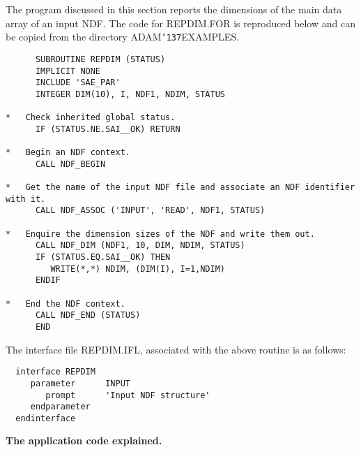 \documentclass[twoside,11pt]{article}
\renewcommand{\_}{{\tt\char'137}}
\begin{document}
The program discussed in this section reports the
dimensions of the main data array of an input NDF.
The code for REPDIM.FOR is reproduced below and can be copied from the
directory ADAM\_EXAMPLES.
\begin{verbatim}
      SUBROUTINE REPDIM (STATUS)
      IMPLICIT NONE
      INCLUDE 'SAE_PAR'
      INTEGER DIM(10), I, NDF1, NDIM, STATUS

*   Check inherited global status.
      IF (STATUS.NE.SAI__OK) RETURN

*   Begin an NDF context.
      CALL NDF_BEGIN

*   Get the name of the input NDF file and associate an NDF identifier with it.
      CALL NDF_ASSOC ('INPUT', 'READ', NDF1, STATUS)

*   Enquire the dimension sizes of the NDF and write them out.
      CALL NDF_DIM (NDF1, 10, DIM, NDIM, STATUS)
      IF (STATUS.EQ.SAI__OK) THEN
         WRITE(*,*) NDIM, (DIM(I), I=1,NDIM)
      ENDIF

*   End the NDF context.
      CALL NDF_END (STATUS)
      END
\end{verbatim}

The interface file REPDIM.IFL, associated with the above routine is
as follows:
\begin{verbatim}
  interface REPDIM
     parameter      INPUT
        prompt      'Input NDF structure'
     endparameter
  endinterface
\end{verbatim}


{\large\bf The application code explained.}
\end{document}
